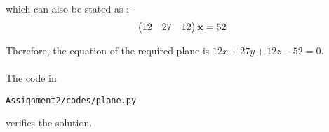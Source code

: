 \documentclass[journal,12pt,twocolumn]{IEEEtran}
\renewcommand\thesection{\arabic{section}}
\begin{document}
\begin{enumerate}[label=\thesection.\arabic*.,ref=\thesection.\theenumi]
which can also be stated as :-
\begin{align}
\begin{pmatrix}12 & 27 & 12\end{pmatrix}\mathbf{x} = 52
\end{align}

Therefore, the equation of the required plane is $12x + 27y + 12z - 52 = 0$.\\
\\
The code in
\begin{lstlisting}
Assignment2/codes/plane.py
\end{lstlisting}
verifies the solution.

\end{enumerate}
\end{document}

